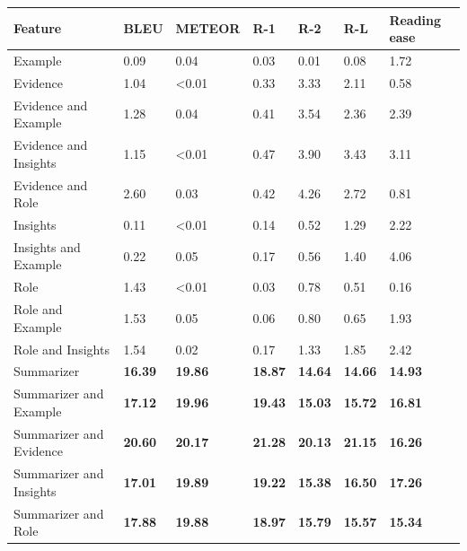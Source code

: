 \begin{tabular}{|l|l|l|l|l|l|l|}
\hline
\textbf{Feature} & BLEU & METEOR & R-1 & R-2 & R-L & Reading ease \\
 \hline
 Example & 0.09 & 0.04 & 0.03 & 0.01 & 0.08 & 1.72 \\
 \hline
 Evidence & 1.04 & \textless{}0.01 & 0.33 & 3.33 & 2.11 & 0.58 \\
 \hline
 Evidence and Example & 1.28 & 0.04 & 0.41 & 3.54 & 2.36 & 2.39 \\
 \hline
 Evidence and Insights & 1.15 & \textless{}0.01 & 0.47 & 3.90 & 3.43 & 3.11 \\
 \hline
 Evidence and Role & 2.60 & 0.03 & 0.42 & 4.26 & 2.72 & 0.81 \\
 \hline
 Insights & 0.11 & \textless{}0.01 & 0.14 & 0.52 & 1.29 & 2.22 \\
 \hline
 Insights and Example & 0.22 & 0.05 & 0.17 & 0.56 & 1.40 & 4.06 \\
 \hline
 Role & 1.43 & \textless{}0.01 & 0.03 & 0.78 & 0.51 & 0.16 \\
 \hline
 Role and Example & 1.53 & 0.05 & 0.06 & 0.80 & 0.65 & 1.93 \\
 \hline
 Role and Insights & 1.54 & 0.02 & 0.17 & 1.33 & 1.85 & 2.42 \\
 \hline
 Summarizer & \textbf{16.39} & \textbf{19.86} & \textbf{18.87} & \textbf{14.64} & \textbf{14.66} & \textbf{14.93} \\
 \hline
 Summarizer and Example & \textbf{17.12} & \textbf{19.96} & \textbf{19.43} & \textbf{15.03} & \textbf{15.72} & \textbf{16.81} \\
 \hline
 Summarizer and Evidence & \textbf{20.60} & \textbf{20.17} & \textbf{21.28} & \textbf{20.13} & \textbf{21.15} & \textbf{16.26} \\
 \hline
 Summarizer and Insights & \textbf{17.01} & \textbf{19.89} & \textbf{19.22} & \textbf{15.38} & \textbf{16.50} & \textbf{17.26} \\
 \hline
 Summarizer and Role & \textbf{17.88} & \textbf{19.88} & \textbf{18.97} & \textbf{15.79} & \textbf{15.57} & \textbf{15.34} \\
\hline
\end{tabular}

